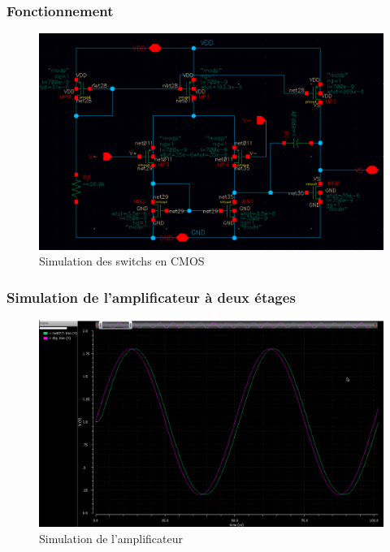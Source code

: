 \documentclass{beamer}
\begin{document}
\begin{frame}
\frametitle{Fonctionnement}

\begin{figure}[!htb]
  \includegraphics[width=0.7\linewidth]{amplificateur_.png}
  \caption{Simulation des switchs en CMOS}
\end{figure}

\end{frame}


\begin{frame}
\frametitle{Simulation de l'amplificateur \`a deux \'etages}

\begin{figure}[!htb]
  \includegraphics[width=0.8\linewidth]{reponse_ampli.png}
  \caption{Simulation de l'amplificateur}
\end{figure}

\end{frame}
\end{document}
